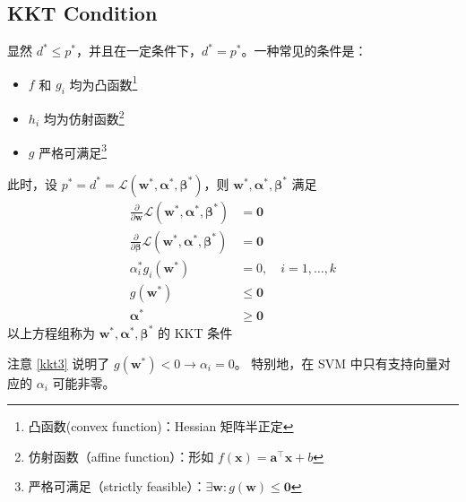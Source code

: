 	\subsection{KKT Condition}\label{sec-kkt}
		显然 $ d^* \leq p^* $，并且在一定条件下，$ d^* = p^* $。一种常见的条件是：
		\begin{itemize}
			\item $ f $ 和 $ g_i $ 均为凸函数\footnote{凸函数(convex function)：Hessian 矩阵半正定}
			\item $ h_i $ 均为仿射函数\footnote{仿射函数（affine function）：形如 $ f(\bm{x}) = \bm{a}^\intercal \bm{x} + b $}
			\item $ g $ 严格可满足\footnote{严格可满足（strictly feasible）：$ \exists \bm{w}: g(\bm{w}) \leq \bm{0} $}
		\end{itemize}
		
		此时，设 $ p^* = d^* = \mathcal{L}(\bm{w}^*, \bm{\alpha}^*, \bm{\beta}^*) $，则 $ \bm{w}^*, \bm{\alpha}^*, \bm{\beta}^* $ 满足
		\begin{align}
		\frac{\partial}{\partial \bm{w}} \mathcal{L}(\bm{w}^*, \bm{\alpha}^*, \bm{\beta}^*) &= \bm{0}\label{kkt1} \\
		\frac{\partial}{\partial \bm{\beta}} \mathcal{L}(\bm{w}^*, \bm{\alpha}^*, \bm{\beta}^*) &= \bm{0} \\
		\alpha_i^* g_i(\bm{w}^*) &=0, \quad i = 1,\ldots,k \label{kkt3}\\
		g(\bm{w}^*) & \leq \bm{0} \\
		\bm{\alpha}^* & \geq \bm{0}
		\end{align}
		以上方程组称为 $ \bm{w}^*, \bm{\alpha}^*, \bm{\beta}^* $ 的 KKT 条件
		
		注意 \eqref{kkt3} 说明了 $ g(\bm{w}^*) < 0 \to \alpha_i = 0 $。
		特别地，在 SVM 中只有支持向量对应的 $ \alpha_i $ 可能非零。
		
